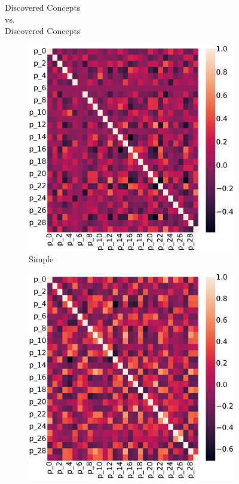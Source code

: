 \begin{figure}
\centering
\begin{minipage}{.49\textwidth}
	\centering
	{\small\sc Discovered Concepts\\vs.\\Discovered Concepts}\\
	\begin{subfigure}{.49\textwidth}
		\includegraphics[width=\textwidth]{imgs/cem/KANDY_2-vit-continual-notriplet_pp.pdf}
		\caption{Simple}
	\end{subfigure}
	\begin{subfigure}{.49\textwidth}
		\includegraphics[width=\textwidth]{imgs/cem/KANDY_2-vit-continual-triplet_pp.pdf}

\end{subfigure}
\end{minipage}
\end{figure}
